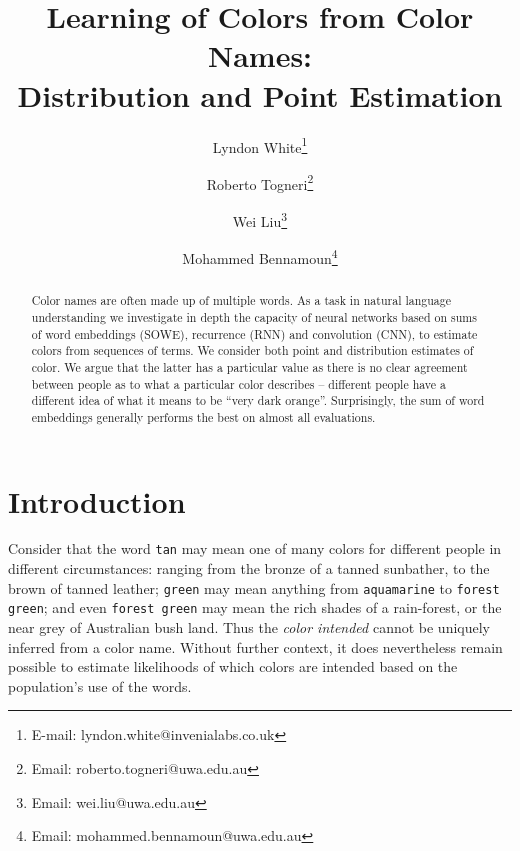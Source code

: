 \documentclass[]{clv3}
\begin{document}
\title{Learning of Colors from Color Names: \\ Distribution and Point Estimation}
\author{Lyndon White\thanks{E-mail: {lyndon.white@invenialabs.co.uk}}}

\author{Roberto Togneri\thanks{Email: {roberto.togneri@uwa.edu.au}}}
\author{Wei Liu\thanks{Email: {wei.liu@uwa.edu.au}}}
\author{Mohammed Bennamoun\thanks{Email: {mohammed.bennamoun@uwa.edu.au}}}



\maketitle
%
\begin{abstract}
Color names are often made up of multiple words.
As a task in natural language understanding we investigate in depth the capacity of neural networks based on sums of word embeddings (SOWE), recurrence (RNN) and convolution (CNN), to estimate colors from sequences of terms.
We consider both point and distribution estimates of color.
We argue that the latter has a particular value as there is no clear agreement between people as to what a particular color describes -- different people have a different idea of what it means to be ``very dark orange''.
Surprisingly, the sum of word embeddings generally performs the best on almost all evaluations.
\end{abstract}

\section{Introduction}\label{sec:intro}

Consider that the word \texttt{tan} may mean one of many colors for different people in different circumstances: ranging from the bronze of a tanned sunbather, to the brown of tanned leather;
\texttt{green} may mean anything from \texttt{aquamarine} to \texttt{forest green};
and even \texttt{forest green} may mean the rich shades of a rain-forest, or the near grey of Australian bush land.
Thus the \emph{color intended} cannot be uniquely inferred from a color name. Without further context, it does nevertheless remain possible to estimate likelihoods of which colors are intended based on the population's use of the words.
\end{document}
